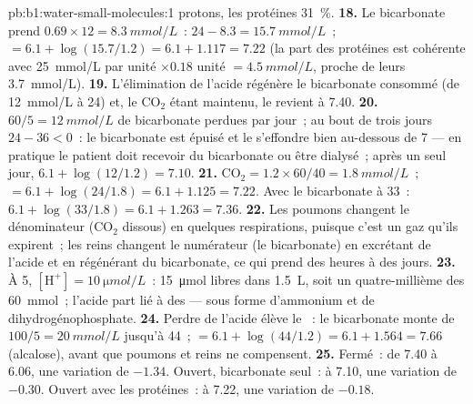 \begin{solution}{pb:b1:water-small-molecules:1}
protons, les protéines \qty{31}{\%}.
\textbf{18.} Le bicarbonate prend $0.69\times 12 = \qty{8.3}{mmol/L}$~:
$24 - 8.3 = \qty{15.7}{mmol/L}$~;  $= 6.1 + \log(15.7/1.2) = 6.1 +
1.117 = 7.22$ (la part des protéines est cohérente avec
\qty{25}{mmol/L} par unité $\times 0.18$ unité $= \qty{4.5}{mmol/L}$,
proche de leurs \qty{3.7}{mmol/L}).
\textbf{19.} L'élimination de l'acide régénère le bicarbonate consommé
(de \qty{12}{mmol/L} à \qty{24}{}) et, le $\mathrm{CO_2}$ étant
maintenu, le  revient à 7.40.
\textbf{20.} $60/5 = \qty{12}{mmol/L}$ de bicarbonate perdues par jour~;
au bout de trois jours $24 - 36 < 0$~: le bicarbonate est épuisé et le
 s'effondre bien au-dessous de 7 --- en pratique le patient doit
recevoir du bicarbonate ou être dialysé~; après un seul jour,
$6.1 + \log(12/1.2) =
7.10$.
\textbf{21.} $\mathrm{CO_2} = 1.2\times 60/40 = \qty{1.8}{mmol/L}$~;
 $= 6.1 + \log(24/1.8) = 6.1 + 1.125 = 7.22$. Avec le bicarbonate à
\qty{33}{}~: $6.1 + \log(33/1.8) = 6.1 + 1.263 = 7.36$.
\textbf{22.} Les poumons changent le dénominateur ($\mathrm{CO_2}$
dissous) en quelques respirations, puisque c'est un gaz qu'ils
expirent~; les reins changent le numérateur (le bicarbonate) en
excrétant de l'acide et en régénérant du bicarbonate, ce qui prend des
heures à des jours.
\textbf{23.} À  5, $[\mathrm{H^+}] = \qty{10}{\micro mol/L}$~: \qty{15}{\micro mol} libres dans \qty{1.5}{L}, soit un quatre-millième des \qty{60}{mmol}~; l'acide part lié à des  --- sous forme d'ammonium et de dihydrogénophosphate.
\textbf{24.} Perdre de l'acide élève le ~: le bicarbonate monte de
$100/5 = \qty{20}{mmol/L}$ jusqu'à \qty{44}{}~;  $= 6.1 + \log(44/1.2) =
6.1 + 1.564 = 7.66$ (alcalose), avant que poumons et reins ne
compensent.
\textbf{25.} Fermé~: de 7.40 à 6.06, une variation de $-1.34$. Ouvert,
bicarbonate seul~: à 7.10, une variation de $-0.30$. Ouvert avec les
protéines~: à 7.22, une variation de $-0.18$.
\end{solution}
